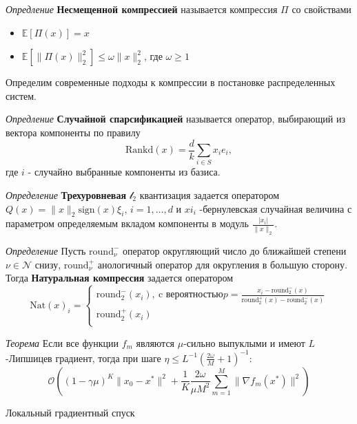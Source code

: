 \textit{Опредление} \textbf{Несмещенной компрессией} называется компрессия $\Pi$ со свойствами \begin{itemize}
    \item $\mathbb{E}[\Pi(x)] = x$
    \item $\mathbb{E}[\|\Pi(x)\|^2_2] \le \omega \| x \|^2_2$, где $\omega \ge 1$
\end{itemize}

Определим современные подходы к компрессии в постановке распределенных систем. 

\textit{Опредление} \textbf{Случайной спарсификацией} \cite{richtarik2016parallel}называется оператор, выбирающий из вектора компоненты по правилу
\begin{equation}
    \text{Rankd}(x) = \frac{d}{k} \sum_{i \in S} x_i e_i,
\end{equation}
где $i$ - случайно выбранные компоненты из базиса.

\textit{Определение} \textbf{Трехуровневая} $\mathcal{l}_2$ квантизация задается оператором
$Q(x)=\|x\|_2 \text{sign}(x)\xi_i$, $i=1,\dots,d$  и $xi_i$ -бернулевская случайная величина с параметром
определяемым вкладом компоненты в модуль $\frac{|x_i|}{\|x\|_2}$.

\textit{Определение}
Пусть $\text{round}_\nu^-$ оператор округляющий число до ближайшей степени $\nu \in \mathcal{N}$ снизу, 
$\text{round}_\nu^+$ анологичный оператор для округления в большую сторону. Тогда \textbf{Натуральная компрессия} задается оператором
\begin{equation}
    \text{Nat}(x)_i = \left\{\begin{array}{c}
        \text{round}_2^-(x_i), \ \text{c вероятностью} p=\frac{x_i - \text{round}_2^-(x)}{\text{round}_2^+(x)-\text{round}_2^-(x)} \\
        \text{round}_2^+(x_i) \\
    \end{array}\right.    
\end{equation}

\textit{Теорема} Если все функции $f_m$ являются $\mu$-сильно выпуклыми
и имеют $L$-Липшицев градиент, тогда при шаге $\eta \le L^{-1} (\frac{2 \omega}{M}+1)^{-1}$:
\begin{equation}
    \mathcal{O}\left(
        (1-\gamma \mu)^K \|x_0 -x^*\|^2 + \frac{1}{K} \frac{2 \omega}{\mu M^2} \sum_{m=1}^M \| \nabla f_m(x^*) \|^2
    \right)
\end{equation}

Локальный градиентный спуск
\cite{karimireddy2020scaffold}

